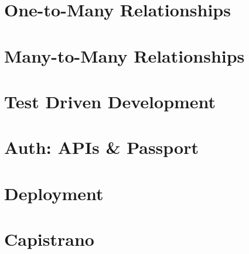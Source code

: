 \documentclass[b5paper,openany]{book}
\begin{document}
\chapter{One-to-Many Relationships}


\chapter{Many-to-Many Relationships}


\chapter{Test Driven Development}


\begin{readonly}
    \chapter{Auth: APIs \& Passport}
    

    \chapter{Deployment}
    

    \chapter{Capistrano}
    
\end{readonly}






\end{document}
